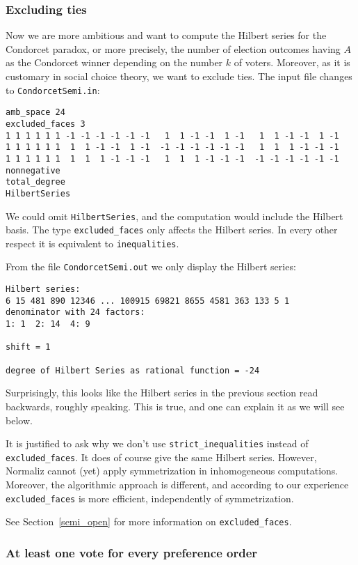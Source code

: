 \documentclass[12pt,a4paper]{scrartcl}
\theoremstyle{definition}
\begin{document}
\subsubsection{Excluding ties}\label{excluded_ex}

Now we are more ambitious and want to compute the Hilbert series for the Condorcet paradox, or more precisely, the number of election outcomes having $A$ as the Condorcet winner depending on the number $k$ of voters. Moreover, as it is customary in social choice theory, we want to exclude ties. The input file changes to \verb|CondorcetSemi.in|:
\begin{Verbatim}
amb_space 24
excluded_faces 3
1 1 1 1 1 1 -1 -1 -1 -1 -1 -1   1  1 -1 -1  1 -1   1  1 -1 -1  1 -1
1 1 1 1 1 1  1  1 -1 -1  1 -1  -1 -1 -1 -1 -1 -1   1  1  1 -1 -1 -1
1 1 1 1 1 1  1  1  1 -1 -1 -1   1  1  1 -1 -1 -1  -1 -1 -1 -1 -1 -1
nonnegative
total_degree
HilbertSeries
\end{Verbatim}
We could omit \verb|HilbertSeries|, and the computation would include the Hilbert basis. The type \verb|excluded_faces| only affects the Hilbert series. In every other respect it is equivalent to \verb|inequalities|.

From the file \verb|CondorcetSemi.out| we only display the Hilbert series:
\begin{Verbatim}
Hilbert series:
6 15 481 890 12346 ... 100915 69821 8655 4581 363 133 5 1 
denominator with 24 factors:
1: 1  2: 14  4: 9  

shift = 1

degree of Hilbert Series as rational function = -24
\end{Verbatim}
Surprisingly, this looks like the Hilbert series in the previous section read backwards, roughly speaking. This is true, and one can explain it as we will see below.

It is justified to ask why we don't use \verb|strict_inequalities| instead of \verb|excluded_faces|. It does of course give the same Hilbert series. However, Normaliz cannot (yet) apply symmetrization in inhomogeneous computations. Moreover, the algorithmic approach is different, and according to our experience \verb|excluded_faces| is more efficient, independently of symmetrization.

See Section~\ref{semi_open} for more information on \verb|excluded_faces|.

\subsubsection{At least one vote for every preference order}\label{strict_signs_ex}
\end{document}
